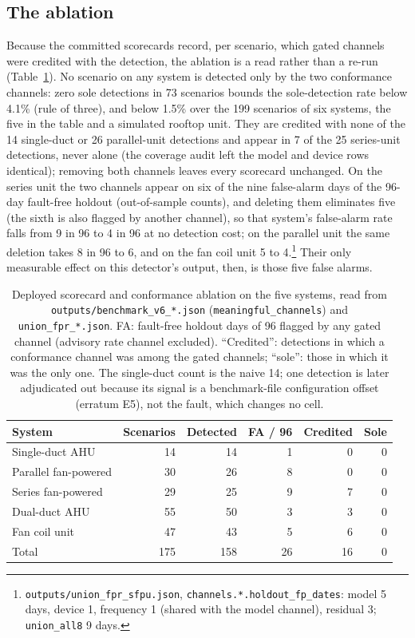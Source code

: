 \documentclass[runningheads]{llncs}
\begin{document}
\subsection{The ablation}

Because the committed scorecards record, per scenario, which gated channels were credited with the detection, the ablation is a read rather than a re-run (Table~\ref{tab:ablation}). No scenario on any system is detected only by the two conformance channels: zero sole detections in 73 scenarios bounds the sole-detection rate below 4.1\% (rule of three), and below 1.5\% over the 199 scenarios of six systems, the five in the table and a simulated rooftop unit. They are credited with none of the 14 single-duct or 26 parallel-unit detections and appear in 7 of the 25 series-unit detections, never alone (the coverage audit left the model and device rows identical); removing both channels leaves every scorecard unchanged. On the series unit the two channels appear on six of the nine false-alarm days of the 96-day fault-free holdout (out-of-sample counts), and deleting them eliminates five (the sixth is also flagged by another channel), so that system's false-alarm rate falls from 9 in 96 to 4 in 96 at no detection cost; on the parallel unit the same deletion takes 8 in 96 to 6, and on the fan coil unit 5 to 4.\footnote{\texttt{outputs/union\_fpr\_sfpu.json}, \texttt{channels.*.holdout\_fp\_dates}: model 5 days, device 1, frequency 1 (shared with the model channel), residual 3; \texttt{union\_all8} 9 days.} Their only measurable effect on this detector's output, then, is those five false alarms.

\begin{table}[t]
\centering
\caption{Deployed scorecard and conformance ablation on the five systems, read from \texttt{outputs/benchmark\_v6\_*.json} (\texttt{meaningful\_channels}) and \texttt{union\_fpr\_*.json}. FA: fault-free holdout days of 96 flagged by any gated channel (advisory rate channel excluded). ``Credited'': detections in which a conformance channel was among the gated channels; ``sole'': those in which it was the only one. The single-duct count is the naive 14; one detection is later adjudicated out because its signal is a benchmark-file configuration offset (erratum E5), not the fault, which changes no cell.}
\label{tab:ablation}
\footnotesize\setlength{\tabcolsep}{4pt}
\begin{tabular}{lrrrrr}
\hline
System & Scenarios & Detected & FA / 96 & Credited & Sole \\
\hline
Single-duct AHU      & 14 & 14 & 1 & 0 & 0 \\
Parallel fan-powered & 30 & 26 & 8 & 0 & 0 \\
Series fan-powered   & 29 & 25 & 9 & 7 & 0 \\
Dual-duct AHU        & 55 & 50 & 3 & 3 & 0 \\
Fan coil unit        & 47 & 43 & 5 & 6 & 0 \\
\hline
Total                & 175 & 158 & 26 & 16 & 0 \\
\hline
\end{tabular}
\end{table}
\end{document}
